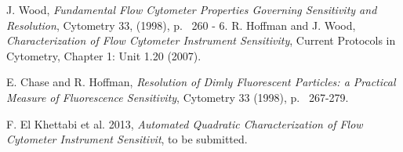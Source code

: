 \documentclass{article}
\begin{document}
\clearpage

\begin{thebibliography}{}

J. Wood,
{ \em Fundamental Flow Cytometer Properties Governing Sensitivity and Resolution}, 
Cytometry 33, (1998), p.~ 260 - 6.
R. Hoffman and J. Wood,
{\em  Characterization of Flow Cytometer Instrument Sensitivity},
 Current Protocols in Cytometry, Chapter 1: Unit 1.20 (2007).
 
E. Chase and R. Hoffman,
{\em  Resolution of Dimly Fluorescent Particles: a Practical Measure of Fluorescence Sensitivity},
Cytometry 33 (1998), p.~ 267-279.

F. El Khettabi et al. 2013, 
{\em Automated Quadratic Characterization of Flow Cytometer Instrument Sensitivit}, to be submitted. 

\end{thebibliography}{}
\end{document}
